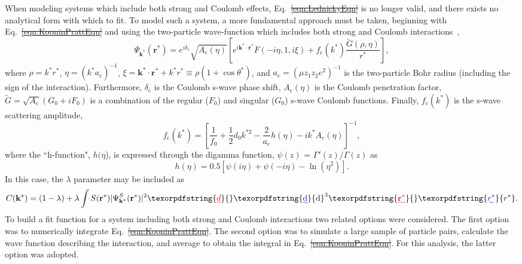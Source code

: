 \documentclass[ALICE,manyauthors]{cernphprep}
\providecommand{\DIFaddtex}[1]{{\protect\color{blue}\uwave{#1}}} %
\providecommand{\DIFdeltex}[1]{{\protect\color{red}\sout{#1}}}                      %
\providecommand{\DIFaddbegin}{} %
\providecommand{\DIFaddend}{} %
\providecommand{\DIFdelbegin}{} %
\providecommand{\DIFdelend}{} %
\providecommand{\DIFadd}[1]{\texorpdfstring{\DIFaddtex{#1}}{#1}} %
\providecommand{\DIFdel}[1]{\texorpdfstring{\DIFdeltex{#1}}{}} %
\begin{document}
When modeling systems which include both strong and Coulomb effects, Eq.~\DIFdelbegin \DIFdel{\ref{eqn:LednickyEqn} }\DIFdelend \DIFaddbegin \DIFadd{(\ref{eqn:LednickyEqn}) }\DIFaddend is no longer valid, and there exists no analytical form with which to fit.
To model such a system, a more fundamental approach must be taken, beginning with Eq.~\DIFdelbegin \DIFdel{\ref{eqn:KooninPrattEqn} }\DIFdelend \DIFaddbegin \DIFadd{(\ref{eqn:KooninPrattEqn}) }\DIFaddend and using the two-particle wave-function which includes both strong and Coulomb interactions~\cite{Lednicky:2005tb},
\begin{equation}
 \Psi_{\mathbf{k^{*}}}(\mathbf{r^{*}}) = e^{i\delta_{\mathrm{c}}}\sqrt{A_{\mathrm{c}}(\eta)}[e^{i\mathbf{k^{*}} \cdot \mathbf{r^{*}}}F(-i\eta,1,i\xi) + f_{\mathrm{c}}(k^{*})\frac{\tilde{G}(\rho,\eta)}{r^{*}}],
\label{eqn:CoulombWaveFcn}
\end{equation}
where $\rho = k^{*}r^{*}$, $\eta = (k^{*}a_{\mathrm{c}})^{-1}$, $\xi = \mathbf{k^{*}} \cdot \mathbf{r^{*}} + k^{*}r^{*} \equiv \rho(1+\cos\theta^{*})$, and $a_{\mathrm{c}} = (\mu z_{1}z_{2}e^{2})^{-1}$ is the two-particle Bohr radius (including the sign of the interaction).  
Furthermore, $\delta_{\mathrm{c}}$ is the Coulomb s-wave phase shift, $A_{\mathrm{c}}(\eta)$ is the Coulomb penetration factor, $\tilde{G} = \sqrt{A_{c}}(G_{0} + iF_{0})$ is a combination of the regular ($F_{0}$) and singular ($G_{0}$) s-wave Coulomb functions.  
Finally, $f_{\mathrm{c}}(k^{*})$ is the s-wave scattering amplitude,
\begin{equation}
 f_{\mathrm{c}}(k^{*}) = \left[\frac{1}{f_{0}} + \frac{1}{2}d_{0}k^{*2} - \frac{2}{a_{\mathrm{c}}}h(\eta) - ik^{*}A_{\mathrm{c}}(\eta)\right]^{-1},
\label{eqn:CoulombScattAmp}
\end{equation}
where the ``h-function", $h(\eta$), is expressed through the digamma function, $\psi(z)$ = $\Gamma'(z)/\Gamma(z)$ as
\begin{equation}
 h(\eta) = 0.5[\psi(i\eta) + \psi(-i\eta) - \ln(\eta^{2})].
\label{eqn:LednickyHFunction}
\end{equation} 
In this case, the $\lambda$ parameter may be included as
\begin{equation}
 C(\mathbf{k^{*}}) = (1 - \lambda) + \lambda\int S(\mathbf{r^{*}})|\Psi^{S}_{\mathbf{k^{*}}}(\mathbf{r^{*}})|^{2}\DIFdelbegin \DIFdel{d}\DIFdelend \DIFaddbegin \DIFadd{\mathrm{d}}\DIFaddend ^{3}\DIFdelbegin \DIFdel{\mathbf{r^{*}}}\DIFdelend \DIFaddbegin \DIFadd{r^{*}}\DIFaddend .
\label{eqn:GenCfEqnwLambda}
\end{equation}
To build a fit function for a system including both strong and Coulomb interactions two related options were considered. 
The first option was to numerically integrate Eq.~\DIFdelbegin \DIFdel{\ref{eqn:KooninPrattEqn}}\DIFdelend \DIFaddbegin \DIFadd{(\ref{eqn:KooninPrattEqn})}\DIFaddend .  
The second option was to simulate a large sample of particle pairs, calculate the wave function describing the interaction, and average to obtain the integral in Eq.~\DIFdelbegin \DIFdel{\ref{eqn:KooninPrattEqn}}\DIFdelend \DIFaddbegin \DIFadd{(\ref{eqn:KooninPrattEqn})}\DIFaddend . 
For this analysis, the latter option was adopted.
\end{document}
